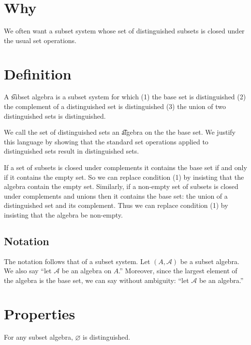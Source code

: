 

\section*{Why}

We often want a subset system whose set of distinguished subsets is closed under the usual set operations.

\section*{Definition}

A \t{subset algebra} is a subset system for which (1) the base set is distinguished (2) the complement of a distinguished set is distinguished (3) the union of two distinguished sets is distinguished.

We call the set of distinguished sets an \t{algebra} on the the base set.
We justify this language by showing that the standard set operations applied to distinguished sets result in distinguished sets.

If a set of subsets is closed under complements it contains the base set if and only if it contains the empty set.
So we can replace condition (1) by insisting that the algebra contain the empty set.
Similarly, if a non-empty set of subsets is closed under complements and unions then it contains the base set: the union of a distinguished set and its complement.
Thus we can replace condition (1) by insisting that the algebra be non-empty.

\subsection*{Notation}

The notation follows that of a subset system.
Let $(A, \mathcal{A} )$ be a subset algebra.
We also say ``let $\mathcal{A} $ be an algebra on $A$.''
Moreover, since the largest element of the algebra is the base set, we can say without ambiguity: ``let $\mathcal{A} $ be an algebra.''

\section*{Properties}

\begin{proposition}
For any subset algebra, $\varnothing$ is distinguished.
\end{proposition}

